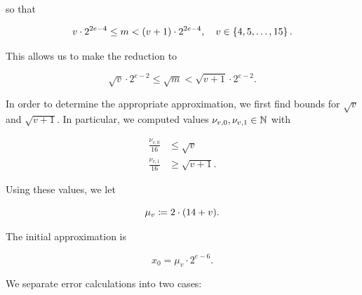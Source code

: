 \noindent
so that

\begin{equation}
    v\cdot2^{2e-4} \le m < \left( v+1 \right)\cdot2^{2e-4},
    \quad v\in\left\{ 4, 5, \dots, 15 \right\}.
\end{equation}

\noindent
This allows us to make the reduction to

\begin{equation}
    \sqrt{v}\cdot2^{e-2} \le \sqrt{m} < \sqrt{v+1}\cdot2^{e-2}.
    \label{eq:app_linear_m_bound}
\end{equation}

In order to determine the appropriate approximation,
we first find bounds for $\sqrt{v}$ and $\sqrt{v+1}$.
In particular, we computed values $\nu_{v,0}, \nu_{v,1}\in\mathbb{N}$ with

\begin{align}
    \frac{\nu_{v,0}}{16} &\le \sqrt{v} \nonumber\\
    \frac{\nu_{v,1}}{16} &\ge \sqrt{v+1}.
    \label{eq:app_linear_v_bound}
\end{align}

\noindent
Using these values,
we let

\begin{equation}
    \mu_{v} \coloneqq{} 2\cdot(14 + v).
\end{equation}

The initial approximation is

\begin{equation}
    x_{0} = \mu_{v}\cdot2^{e-6}.
\end{equation}

\noindent
We separate error calculations into two cases:

